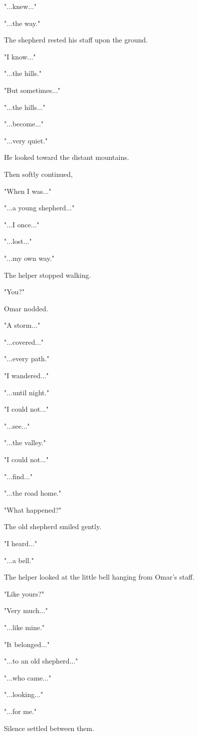 \documentclass[12pt,openany]{book}
\begin{document}
"...knew..."

"...the way."

The shepherd rested his staff upon the ground.

"I know..."

"...the hills."

"But sometimes..."

"...the hills..."

"...become..."

"...very quiet."

He looked toward the distant mountains.

Then softly continued,

"When I was..."

"...a young shepherd..."

"...I once..."

"...lost..."

"...my own way."

The helper stopped walking.

"You?"

Omar nodded.

"A storm..."

"...covered..."

"...every path."

"I wandered..."

"...until night."

"I could not..."

"...see..."

"...the valley."

"I could not..."

"...find..."

"...the road home."

"What happened?"

The old shepherd smiled gently.

"I heard..."

"...a bell."

The helper looked at the little bell hanging from Omar's staff.

"Like yours?"

"Very much..."

"...like mine."

"It belonged..."

"...to an old shepherd..."

"...who came..."

"...looking..."

"...for me."

Silence settled between them.
\end{document}
